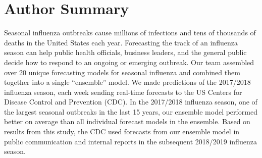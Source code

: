 \documentclass{article}\usepackage[]{graphicx}\usepackage[]{color}
\begin{document}
% 




\section*{Author Summary}
Seasonal influenza outbreaks cause millions of infections and tens of thousands of deaths in the United States each year. Forecasting the track of an influenza season can help public health officials, business leaders, and the general public decide how to respond to an ongoing or emerging outbreak. Our team assembled over 20 unique forecasting models for seasonal influenza and combined them together into a single ``ensemble'' model. We made predictions of the 2017/2018 influenza season, each week sending real-time forecasts to the US Centers for Disease Control and Prevention (CDC). 
In the 2017/2018 influenza season, one of the largest seasonal outbreaks in the last 15 years, our ensemble model performed better on average than all individual forecast models in the ensemble. 
Based on results from this study, the CDC used forecasts from our ensemble model in public communication and internal reports in the subsequent 2018/2019 influenza season.
\end{document}
